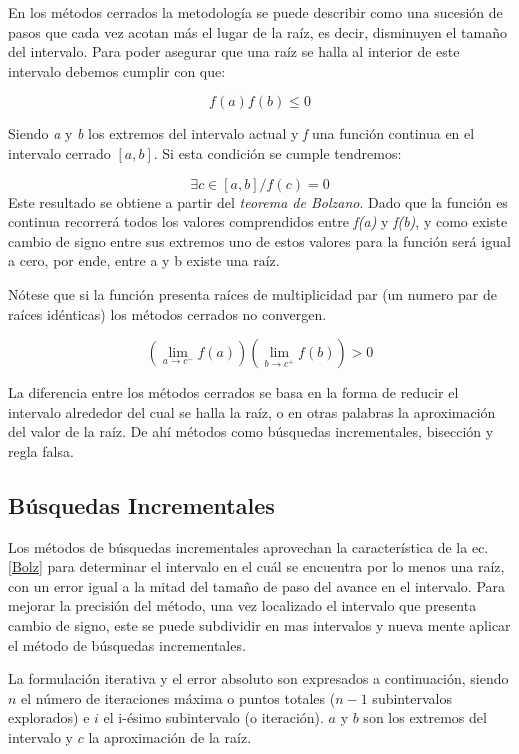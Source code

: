 \documentclass[letterpaper,10pt,oneside]{sphinxmanual}
\theoremstyle{plain}%
\theoremstyle{definition}%
\theoremstyle{remark}%
\begin{document}
\noindent En los métodos cerrados la metodología se puede describir como una sucesión de pasos que
cada vez acotan más el lugar de la raíz, es decir, disminuyen el tamaño del intervalo. Para
poder asegurar que una raíz se halla al interior de este intervalo debemos cumplir con que:\medskip

\begin{equation}
 f(a)f(b)\leq 0 \label{Bolz}
\end{equation}

\noindent Siendo \textit{a} y \textit{b} los extremos del intervalo actual y \textit{f} una función continua en el intervalo cerrado $\left[a,b\right]$. Si esta condición se cumple tendremos:\medskip

\[ \exists c \in \left[ a,b \right]/f(c)=0 \]
Este resultado se obtiene a partir del \textit{teorema de Bolzano}. Dado que la función es continua
recorrerá todos los valores comprendidos entre \textit{f(a)} y \textit{f(b)}, y como existe cambio de signo
entre sus extremos uno de estos valores para la función será igual a cero, por ende, entre a y b
existe una raíz.\medskip

\noindent Nótese que si la función presenta raíces de multiplicidad par (un numero par de raíces
idénticas) los métodos cerrados no convergen.\medskip

\[ \left(\lim_{a \to c^{-}}f(a)\right)\left(\lim_{b \to c^{+}}f(b)\right)> 0  \]

\noindent La diferencia entre los métodos cerrados se basa en la forma de reducir el intervalo alrededor
del cual se halla la raíz, o en otras palabras la aproximación del valor de la raíz. De ahí métodos
como búsquedas incrementales, bisección y regla falsa.\noindent

\subsection{Búsquedas Incrementales}

\noindent Los métodos de búsquedas incrementales aprovechan la característica de la ec.\ref{Bolz} para determinar el intervalo en el cuál se encuentra por lo menos una raíz, con un error igual a la mitad del tamaño de paso del avance en el intervalo. Para mejorar la precisión del método, una vez localizado el intervalo que presenta cambio de signo, este se puede subdividir en mas intervalos y nueva mente aplicar el método de búsquedas incrementales.\medskip

\noindent La formulación iterativa y el error absoluto son expresados a continuación, siendo $n$ el número de iteraciones máxima o puntos totales ($n-1$ subintervalos explorados) e $i$ el i-ésimo subintervalo (o iteración). $a$ y $b$ son los extremos del intervalo y $c$ la aproximación de la raíz.\medskip
\end{document}
